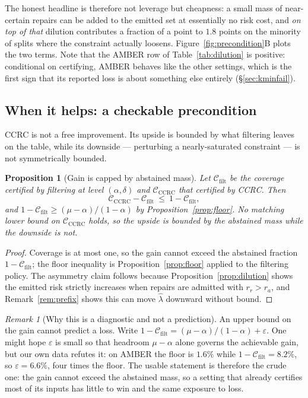 \documentclass{article}
\theoremstyle{plain}
\newtheorem{proposition}{Proposition}
\theoremstyle{definition}
\theoremstyle{remark}
\newtheorem{remark}{Remark}
\newcommand{\Cov}{\mathcal{C}}
\begin{document}
The honest headline is therefore not leverage but cheapness: a small mass of near-certain
repairs can be added to the emitted set at essentially no risk cost, and \emph{on top of that}
dilution contributes a fraction of a point to $1.8$ points on the minority of splits where the
constraint actually loosens. Figure~\ref{fig:precondition}B plots the two terms. Note that the
AMBER row of Table~\ref{tab:dilution} is positive: conditional on certifying, AMBER behaves like
the other settings, which is the first sign that its reported loss is about something else
entirely (\S\ref{sec:kminfail}).

\subsection{When it helps: a checkable precondition}
\label{sec:precondition}

CCRC is not a free improvement. Its upside is bounded by what filtering leaves on the
table, while its downside --- perturbing a nearly-saturated constraint --- is not
symmetrically bounded.

\begin{proposition}[Gain is capped by abstained mass]
\label{prop:precondition}
Let $\Cov_{\mathrm{filt}}$ be the coverage certified by filtering at level $(\alpha,\delta)$
and $\Cov_{\mathrm{CCRC}}$ that certified by CCRC. Then
\[
\Cov_{\mathrm{CCRC}}-\Cov_{\mathrm{filt}}\ \le\ 1-\Cov_{\mathrm{filt}},
\]
and $1-\Cov_{\mathrm{filt}}\ge(\mu-\alpha)/(1-\alpha)$ by
Proposition~\ref{prop:floor}. No matching lower bound on $\Cov_{\mathrm{CCRC}}$ holds, so
the upside is bounded by the abstained mass while the downside is not.
\end{proposition}

\begin{proof}
Coverage is at most one, so the gain cannot exceed the abstained fraction
$1-\Cov_{\mathrm{filt}}$; the floor inequality is Proposition~\ref{prop:floor} applied to
the filtering policy. The asymmetry claim follows because
Proposition~\ref{prop:dilution} shows the emitted risk strictly increases when repairs are
admitted with $r_r>r_a$, and Remark~\ref{rem:prefix} shows this can move $\hat\lambda$
downward without bound.
\end{proof}

\begin{remark}[Why this is a diagnostic and not a prediction]
\label{rem:notprediction}
An upper bound on the gain cannot predict a loss. Write
$1-\Cov_{\mathrm{filt}}=(\mu-\alpha)/(1-\alpha)+\varepsilon$. One might hope $\varepsilon$
is small so that headroom $\mu-\alpha$ alone governs the achievable gain, but our own data
refutes it: on AMBER the floor is $1.6\%$ while $1-\Cov_{\mathrm{filt}}=8.2\%$, so
$\varepsilon=6.6\%$, four times the floor. The usable statement is therefore the crude one:
the gain cannot exceed the abstained mass, so a setting that already certifies most of its
inputs has little to win and the same exposure to loss.
\end{remark}
\end{document}

